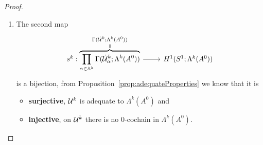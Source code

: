 \begin{proof}
\begin{enumerate}
\begin{comment}
                ODE-Theory, says that a germ defines a solution in a
                \textbf{neighbourhood}
              \item \PROBLEM[why is the neighbourhood large enough?] I.e.\
                \[
                  \substack{the\\neighbourhood}\supset\cU_\alpha^k \,?
                \]
            \end{itemize}
          \item $U_\alpha^k$ is the largest arc, to contain no corresponding
            Stokes ray
            \begin{itemize}
              \item Then might \cite[Lemma 1]{BJL1979Birkhoff} on p.\ 73 help
            \end{itemize}
          \item Every arc $U\in\dot\cU_\alpha^k$ has the width $\frac{\pi}{k}$
            and is delimited by Stokes directions.
          \item maybe follows from \cite[Prop.1.24]{thboalch}
          \item \textbf{See \cite{babbitt1989local}}
          \item See \cite[375]{Martinet1991} and
            \cite[Def.5 on 372]{Martinet1991}
        \end{itemize}
      \end{comment}
    \item The second map
      \[ \begin{tikzcd}
        s^k:
        \overset{\Gamma(\dot\cU^k;\Lambda^k(A^0))}{%
          \overset{\text{\rotatebox[origin=c]{-90}{$=$}}}{%
            \overbrace{%
              \prod_{\alpha\in\A^k}\Gamma(\dot\cU_\alpha^k;\Lambda^k(A^0))
            }
        }}
        \rar &
        H^1(S^1;\Lambda^k(A^0))
      \end{tikzcd} \]
      is a bijection,  from
      Proposition~\ref{prop:adequateProperties} we know that it is
      \begin{itemize}
        \item \textbf{surjective},  $\mathcal{U}^k$ is adequate to
          $\Lambda^k(A^0)$ and
        \item \textbf{injective},  on $\mathcal{U}^k$ there is no
          $0$-cochain in $\Lambda^k(A^0)$.
      \end{itemize}
  \end{enumerate}
  \PROBLEM[Naturality?]
\end{proof}

